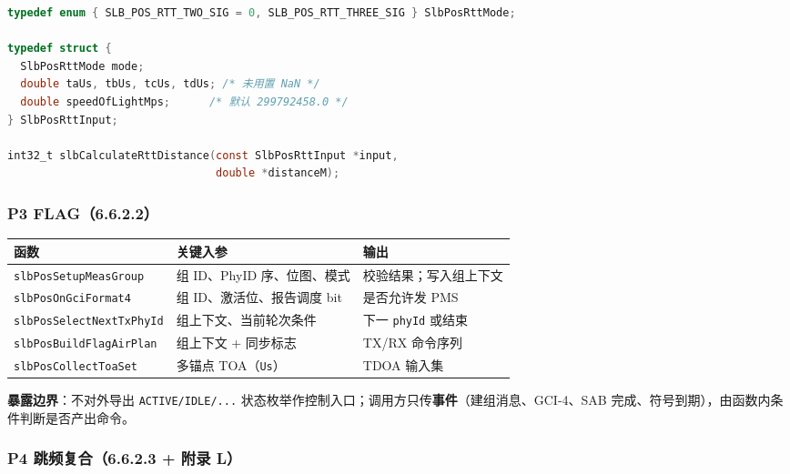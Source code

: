 \documentclass[11pt,a4paper]{ctexart}
\begin{document}
\begin{lstlisting}[language=C,caption={RTT 距离计算接口}]
typedef enum { SLB_POS_RTT_TWO_SIG = 0, SLB_POS_RTT_THREE_SIG } SlbPosRttMode;

typedef struct {
  SlbPosRttMode mode;
  double taUs, tbUs, tcUs, tdUs; /* 未用置 NaN */
  double speedOfLightMps;      /* 默认 299792458.0 */
} SlbPosRttInput;

int32_t slbCalculateRttDistance(const SlbPosRttInput *input,
                                double *distanceM);
\end{lstlisting}

\subsubsection{P3 FLAG（6.6.2.2）}

\begin{table}[h]
\centering
\small
\begin{tabular}{L{4.6cm}L{4.2cm}L{4.4cm}}
\toprule
\textbf{函数} & \textbf{关键入参} & \textbf{输出} \\
\midrule
\texttt{slbPosSetupMeasGroup} & 组 ID、PhyID 序、位图、模式 & 校验结果；写入组上下文 \\
\texttt{slbPosOnGciFormat4} & 组 ID、激活位、报告调度 bit & 是否允许发 PMS \\
\texttt{slbPosSelectNextTxPhyId} & 组上下文、当前轮次条件 & 下一 \texttt{phyId} 或结束 \\
\texttt{slbPosBuildFlagAirPlan} & 组上下文 + 同步标志 & TX/RX 命令序列 \\
\texttt{slbPosCollectToaSet} & 多锚点 TOA（\texttt{Us}） & TDOA 输入集 \\
\bottomrule
\end{tabular}
\end{table}

\textbf{暴露边界}：不对外导出 \texttt{ACTIVE/IDLE/...} 状态枚举作控制入口；调用方只传\textbf{事件}（建组消息、GCI-4、SAB 完成、符号到期），由函数内条件判断是否产出命令。

\subsubsection{P4 跳频复合（6.6.2.3 + 附录 L）}
\end{document}
